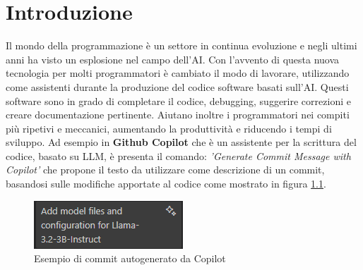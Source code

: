 \documentclass[12pt,a4paper,openright,twoside]{book}
\begin{document}
\mainmatter

\chapter{Introduzione}
\label{chap:introduction}
Il mondo della programmazione è un settore in continua evoluzione e negli ultimi anni ha visto un esplosione nel campo dell'\ac{AI}.
Con l'avvento di questa nuova tecnologia per molti programmatori è cambiato il modo di lavorare, utilizzando come assistenti durante la produzione del codice software basati sull'\ac{AI}.
Questi software sono in grado di completare il codice, debugging, suggerire correzioni e creare documentazione pertinente.
Aiutano inoltre i programmatori nei compiti più ripetivi e meccanici, aumentando la produttività e riducendo i tempi di sviluppo.
Ad esempio in \textbf{Github Copilot} che è un assistente per la scrittura del codice, basato su \ac{LLM}, è presenta il comando: \emph{'Generate Commit Message with Copilot'}
che propone il testo da utilizzare come descrizione di un commit, basandosi sulle modifiche apportate al codice come mostrato in figura \cref{fig:Commit-Autogenerato}.
\begin{figure}[h]
    \centering
    \includegraphics[width=0.5\linewidth]{figures/commit.png}
    \caption{Esempio di commit autogenerato da Copilot}
    \label{fig:Commit-Autogenerato}
\end{figure}
\end{document}
